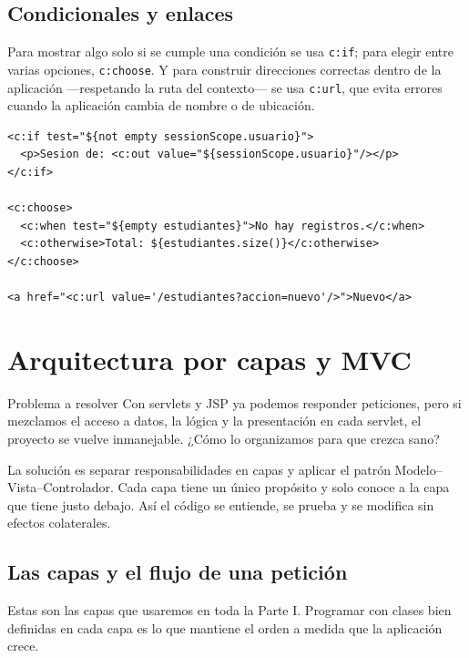\documentclass[11pt]{article}
\begin{document}
\subsection{Condicionales y enlaces}
Para mostrar algo solo si se cumple una condición se usa \texttt{c:\allowbreak{}if}; para elegir entre varias opciones, \texttt{c:\allowbreak{}choose}. Y para construir direcciones correctas dentro de la aplicación —respetando la ruta del contexto— se usa \texttt{c:\allowbreak{}url}, que evita errores cuando la aplicación cambia de nombre o de ubicación.

\begin{cajacodigo}
\begin{lstlisting}[style=markup]
<c:if test="${not empty sessionScope.usuario}">
  <p>Sesion de: <c:out value="${sessionScope.usuario}"/></p>
</c:if>

<c:choose>
  <c:when test="${empty estudiantes}">No hay registros.</c:when>
  <c:otherwise>Total: ${estudiantes.size()}</c:otherwise>
</c:choose>

<a href="<c:url value='/estudiantes?accion=nuevo'/>">Nuevo</a>
\end{lstlisting}
\end{cajacodigo}
\vspace{2pt}
\section{Arquitectura por capas y MVC}
\begin{cajaproblema}{Problema a resolver}
Con servlets y JSP ya podemos responder peticiones, pero si mezclamos el acceso a datos, la lógica y la presentación en cada servlet, el proyecto se vuelve inmanejable. ¿Cómo lo organizamos para que crezca sano?\par
\end{cajaproblema}
La solución es separar responsabilidades en capas y aplicar el patrón Modelo–Vista–Controlador. Cada capa tiene un único propósito y solo conoce a la capa que tiene justo debajo. Así el código se entiende, se prueba y se modifica sin efectos colaterales.

\subsection{Las capas y el flujo de una petición}
Estas son las capas que usaremos en toda la Parte I. Programar con clases bien definidas en cada capa es lo que mantiene el orden a medida que la aplicación crece.
\end{document}
